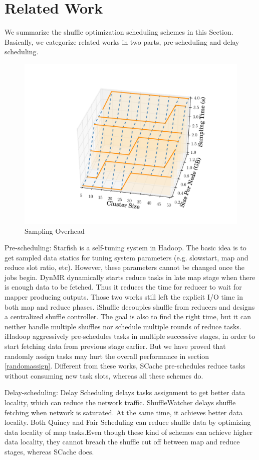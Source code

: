 \section{Related Work}
We summarize the shuffle optimization scheduling schemes in this Section. Basically, we categorize related works in two parts, pre-scheduling and delay scheduling.
\begin{figure}
	\centering
	\includegraphics[width=0.8\linewidth]{fig/sampling}
	\caption{Sampling Overhead}
	\label{fig:sampling}
\end{figure}
Pre-scheduling: Starfish \cite{starfish} is a self-tuning system in Hadoop. The basic idea is to get sampled data statics for tuning system parameters (e.g. slowstart, map and reduce slot ratio, etc). However, these parameters cannot be changed once the jobs begin. DynMR \cite{dynmr} dynamically starts reduce tasks in late map stage when there is enough data to be fetched. Thus it reduces the time for reducer to wait for mapper producing outputs. Those two works still left the explicit I/O time in both map and reduce phases. iShuffle \cite{ishuffle} decouples shuffle from reducers and designs a centralized shuffle controller. The goal is also to find the right time, but it can neither handle multiple shuffles nor schedule multiple rounds of reduce tasks. iHadoop \cite{ihadoop} aggressively pre-schedules tasks in multiple successive stages, in order to start fetching data from previous stage earlier. But we have proved that randomly assign tasks may hurt the overall performance in section \ref{randomassign}. Different from these works, SCache pre-schedules reduce tasks without consuming new task slots, whereas all these schemes do.

Delay-scheduling: Delay Scheduling \cite{delay} delays tasks assignment to get better data locality, which can reduce the network traffic. ShuffleWatcher \cite{shufflewatcher} delays shuffle fetching when network is saturated. At the same time, it achieves better data locality. Both Quincy \cite{quincy} and Fair Scheduling \cite{preemptive} can reduce shuffle data by optimizing data locality of map tasks.Even though these kind of schemes can achieve higher data locality, they cannot breach the shuffle cut off between map and reduce stages, whereas SCache does. 
